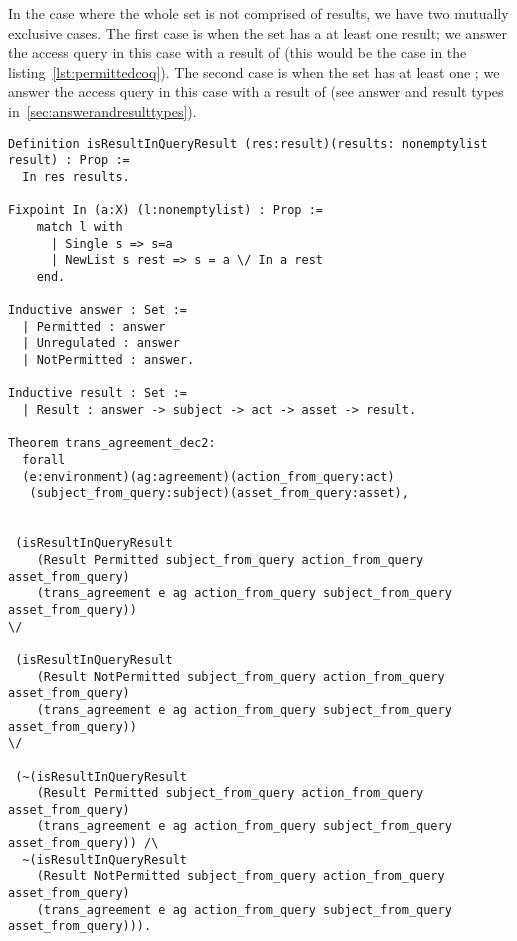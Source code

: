 In the case where the whole set is not comprised of  results, we have two mutually exclusive cases. The first case is when the set has a at least one  result; we answer the access query in this case with a result of  (this would be the case in the listing~\ref{lst:permittedcoq}). The second case is when the set has at least one ; we answer the access query in this case with a result of  (see answer and result types in~\ref{sec:answerandresulttypes}).


\begin{lstlisting}
Definition isResultInQueryResult (res:result)(results: nonemptylist result) : Prop :=
  In res results.

Fixpoint In (a:X) (l:nonemptylist) : Prop :=
    match l with
      | Single s => s=a
      | NewList s rest => s = a \/ In a rest
    end.

Inductive answer : Set :=
  | Permitted : answer
  | Unregulated : answer
  | NotPermitted : answer.

Inductive result : Set :=
  | Result : answer -> subject -> act -> asset -> result.

Theorem trans_agreement_dec2:
  forall
  (e:environment)(ag:agreement)(action_from_query:act)
   (subject_from_query:subject)(asset_from_query:asset),


 (isResultInQueryResult 
    (Result Permitted subject_from_query action_from_query asset_from_query)
    (trans_agreement e ag action_from_query subject_from_query asset_from_query)) 
\/

 (isResultInQueryResult 
    (Result NotPermitted subject_from_query action_from_query asset_from_query)
    (trans_agreement e ag action_from_query subject_from_query asset_from_query))
\/

 (~(isResultInQueryResult 
    (Result Permitted subject_from_query action_from_query asset_from_query)
    (trans_agreement e ag action_from_query subject_from_query asset_from_query)) /\
  ~(isResultInQueryResult 
    (Result NotPermitted subject_from_query action_from_query asset_from_query)
    (trans_agreement e ag action_from_query subject_from_query asset_from_query))).

\end{lstlisting}

